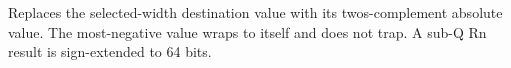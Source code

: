 Replaces the selected-width destination value with its two\textquotesingle{}s-complement absolute value. The most-negative value wraps to itself and does not trap. A sub-Q Rn result is sign-extended to 64 bits.
